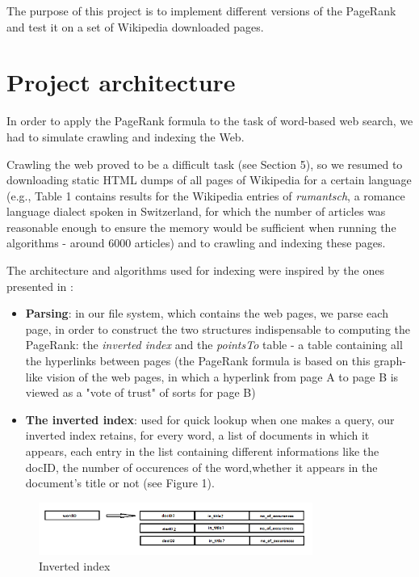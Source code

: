 \documentclass[pdftex,12pt,a4paper]{article}
\begin{document}
The purpose of this project is to implement different versions of the PageRank and test it on a set of Wikipedia downloaded pages.


\section{Project architecture}

In order to apply the PageRank formula to the task of word-based web search, we had to simulate crawling and indexing the Web. 

Crawling the web proved to be a difficult task (see Section 5), so we resumed to downloading static HTML dumps of all pages of Wikipedia for a certain language (e.g., Table 1 contains results for the Wikipedia entries of \emph{rumantsch}, a romance language dialect spoken in Switzerland, for which the number of articles was reasonable enough to ensure the memory would be sufficient when running the algorithms - around 6000 articles) and to crawling and indexing these pages.
\vspace{10pt}

The architecture and algorithms used for indexing were inspired by the ones presented in \cite{1}:

\begin{itemize}
\item \textbf{Parsing}: in our file system, which contains the web pages, we parse each page, in order to construct the two structures indispensable to computing the PageRank: the \emph{inverted index} and the \emph{pointsTo} table - a table containing all the hyperlinks between pages (the PageRank formula is based on this graph-like vision of the web pages, in which a hyperlink from page A to page B is viewed as a "vote of trust" of sorts for page B)
\item \textbf{The inverted index}: used for quick lookup when one makes a query, our inverted index retains, for every word, a list of documents in which it appears, each entry in the list containing different informations like the docID, the number of occurences of the word,whether it appears in the document's title or not (see Figure 1).

\end{itemize}

\begin{figure}[h]
\includegraphics[width=0.8\textwidth]{index.png}
\caption{Inverted index}
\end{figure}
\end{document}

